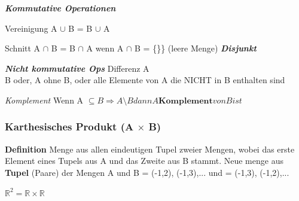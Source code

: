 \textbf{\textit{Kommutative Operationen}}

Vereinigung A $\cup$ B = B $\cup$ A

Schnitt A $\cap$ B = B $\cap$ A wenn A $\cap$ B = \{\}\} (leere Menge) \textbf{\textit{Disjunkt}}

\textbf{\textit{Nicht kommutative Ops}}
Differenz A \\ B oder, A ohne B, oder alle Elemente von A die NICHT in B enthalten sind

\textit{Komplement}
Wenn A $\subseteq B \Rightarrow A \setminus B dann A \textbf{Komplement} von B ist $ 


\subsubsection{Karthesisches Produkt (A $\times$ B)}
\textbf{Definition} Menge aus allen eindeutigen Tupel zweier Mengen, wobei das erste Element eines Tupels aus A und das Zweite aus B stammt. 
Neue menge aus \textbf{Tupel} (Paare) der Mengen A und B = {(-1,2), (-1,3),...} und = {(-1,3), (-1,2),...}

$\mathbb{R}^2 = \mathbb{R} \times \mathbb{R}$